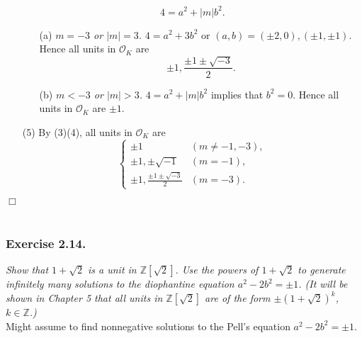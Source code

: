 \documentclass{article}
\begin{document}
\begin{enumerate}
$$4 = a^2 + |m|b^2.$$
  \begin{enumerate}
  \item[(a)]
  \emph{$m = -3$ or $|m| = 3$.}
  $4 = a^2 + 3b^2$ or $(a,b) = (\pm 2,0), (\pm 1, \pm 1)$.
  Hence all units in $\mathcal{O}_K$ are
  $$\pm 1, \frac{\pm 1 \pm \sqrt{-3}}{2}.$$
  \item[(b)]
  \emph{$m < -3$ or $|m| > 3$.}
  $4 = a^2 + |m|b^2$ implies that $b^2 = 0$.
  Hence all units in $\mathcal{O}_K$ are $\pm 1$.
  \end{enumerate}
\item[(5)]
By (3)(4), all units in $\mathcal{O}_K$ are
  \begin{equation*}
    \begin{cases}
      \pm 1                                & (m \neq -1, -3), \\
      \pm 1, \pm \sqrt{-1}                 & (m = -1), \\
      \pm 1, \frac{\pm 1 \pm \sqrt{-3}}{2} & (m = -3).
    \end{cases}
  \end{equation*}
\end{enumerate}
$\Box$ \\\\






\subsubsection*{Exercise 2.14.}
\emph{Show that $1+\sqrt{2}$ is a unit in $\mathbb{Z}[\sqrt{2}]$.
Use the powers of $1+\sqrt{2}$ to generate infinitely many solutions
to the diophantine equation $a^2 - 2b^2 = \pm 1$.
(It will be shown in Chapter 5 that all units in $\mathbb{Z}[\sqrt{2}]$
are of the form $\pm(1+\sqrt{2})^k$, $k \in \mathbb{Z}$.)} \\

Might assume to find nonnegative solutions to the Pell's equation $a^2 - 2b^2 = \pm 1$. \\
\end{document}
